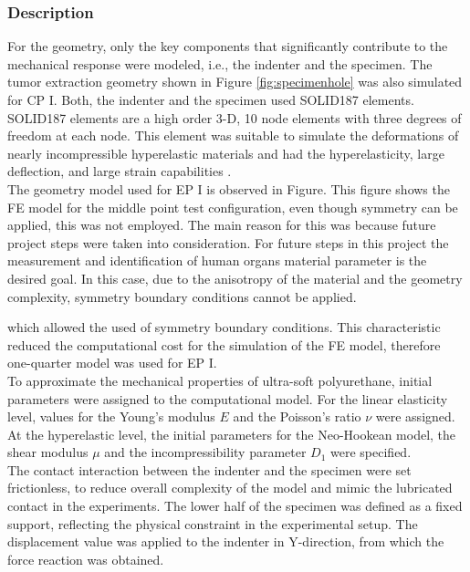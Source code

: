 \subsubsection*{Description}

For the geometry, only the key components that significantly contribute to the mechanical response were modeled, 
i.e., the indenter and the specimen. The tumor extraction geometry shown in Figure \ref{fig:specimenhole}
was also simulated for CP I. Both, the indenter and the specimen used SOLID187 elements. 
SOLID187 elements are a high order 3-D, 10 node elements with three degrees of freedom at each node. 
This element was suitable to simulate the deformations of nearly incompressible hyperelastic materials 
and had the hyperelasticity, large deflection, and large strain capabilities \cite{Ansys2010}.\\

The geometry model used for EP I is observed in Figure. %
This figure shows the FE model for the middle point test configuration, even though symmetry can be applied, this was 
not employed. The main reason for this was because future project steps were taken into consideration. 
For future steps in this project the measurement and identification of human organs material parameter 
is the desired goal. In this case, due to the anisotropy of the material and the geometry complexity,
symmetry boundary conditions cannot be applied. 


which allowed the used 
of symmetry boundary conditions. This characteristic reduced the computational cost for the simulation 
of the FE model, therefore one-quarter model was used for EP I.\\

To approximate the mechanical properties of ultra-soft polyurethane, initial parameters were assigned 
to the computational model. For the linear elasticity level, values for the Young's modulus $E$ and the 
Poisson's ratio $\nu$ were assigned. At the hyperelastic level, the initial parameters for the Neo-Hookean model, 
the shear modulus $\mu$ and the incompressibility parameter $D_1$ were specified.\\ 

The contact interaction between the indenter and the specimen were set frictionless, to reduce 
overall complexity of the model and mimic the lubricated contact in the experiments.
The lower half of the specimen was defined as a fixed support, reflecting the physical constraint in the 
experimental setup. The displacement value was applied to the indenter in Y-direction, 
from which the force reaction was obtained.

